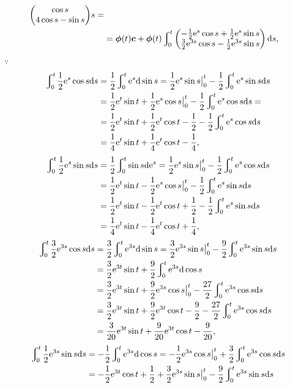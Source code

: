 \documentclass[12pt,UTF8]{ctexart}
\newcommand{\Int}[4]{\varint\nolimits_{#1}^{#2}#3\mathrm d#4}
\newcommand{\me}[0]{\mathrm e}
\begin{document}
\begin{enumerate}
\[\begin{aligned}
{\begin{pmatrix}
\cos s\\
4\cos s-\sin s
\end{pmatrix}}s=\\
&=\bm\phi(t)\bm c+\bm\phi(t)\Int0t{\begin{pmatrix}
-\frac12\me^s\cos s+\frac12\me^s\sin s\\
\frac32\me^{3s}\cos s-\frac12\me^{3s}\sin s
\end{pmatrix}}s,
\end{aligned}\]
$\because$
\[\begin{aligned}
\Int0t{\frac12\me^s\cos s}s&=\frac12\Int0t{\me^s}{\sin s}=\frac12\me^s\sin s\big|_0^t-\frac12\Int0t{\me^s\sin s}s\\
&=\frac12\me^t\sin t+\frac12\me^s\cos s\big|_0^t-\frac12\Int0t{\me^s\cos s}s=\\
&=\frac12\me^t\sin t+\frac12\me^t\cos t-\frac12-\frac12\Int0t{\me^s\cos s}s\\
&=\frac14\me^t\sin t+\frac14\me^t\cos t-\frac14,
\end{aligned}\]
\[\begin{aligned}
\Int0t{\frac12\me^s\sin s}s&=\frac12\Int0t{\sin s}{\me^s}=\frac12\me^s\sin s\big|_0^t-\frac12\Int0t{\me^s\cos s}s\\
&=\frac12\me^t\sin t-\frac12\me^s\cos s\big|_0^t-\frac12\Int0t{\me^s\sin s}s\\
&=\frac12\me^t\sin t-\frac12\me^t\cos t+\frac12-\frac12\Int0t{\me^s\sin s}s\\
&=\frac14\me^t\sin t-\frac14\me^t\cos t+\frac14,
\end{aligned}\]
\[\begin{aligned}
\Int0t{\frac32\me^{3s}\cos s}s&=\frac32\Int0t{\me^{3s}}{\sin s}=\frac32\me^{3s}\sin s\big|_0^t-\frac{9}2\Int0t{\me^{3s}\sin s}s\\
&=\frac32\me^{3t}\sin t+\frac{9}2\Int0t{\me^{3s}}{\cos s}\\
&=\frac32\me^{3t}\sin t+\frac{9}2\me^{3s}\cos s\big|_0^t-\frac{27}2\Int0t{\me^{3s}\cos s}s\\
&=\frac32\me^{3t}\sin t+\frac{9}2\me^{3t}\cos t-\frac{9}2-\frac{27}2\Int0t{\me^{3s}\cos s}s\\
&=\frac3{20}\me^{3t}\sin t+\frac9{20}\me^{3t}\cos t-\frac9{20},
\end{aligned}\]
\[\begin{aligned}
\Int0t{\frac12\me^{3s}\sin s}s&=-\frac12\Int0t{\me^{3s}}{\cos s}=-\frac12\me^{3s}\cos s\big|_0^t+\frac32\Int0t{\me^{3s}\cos s}s\\
&=-\frac12\me^{3t}\cos t+\frac12+\frac32\me^{3s}\sin s\big|_0^t-\frac92\Int0t{\me^{3s}\sin s}s\\

\end{aligned}\]
\end{enumerate}
\end{document}
